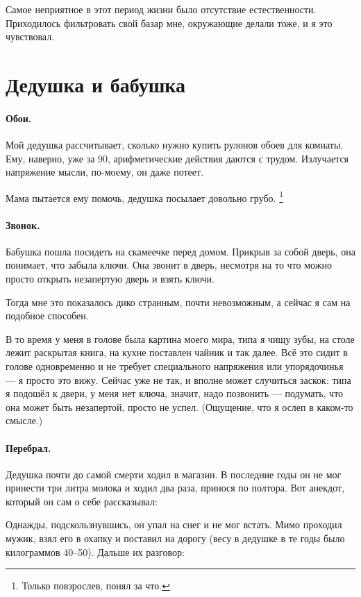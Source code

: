 \documentclass{book}
\begin{document}
Самое неприятное в этот период жизни было отсутствие естественности.
Приходилось фильтровать свой базар мне, окружающие делали тоже, и я это чувствовал.

\section*{Дедушка и бабушка}

\paragraph{Обои.} 
Мой дедушка рассчитывает, сколько нужно купить рулонов обоев для комнаты.
Ему, наверно, уже за 90, 
арифметические действия даются с трудом.
Излучается напряжение мысли, по-моему, он даже потеет.

Мама пытается ему помочь, 
дедушка посылает довольно грубо.%
\footnote{Только повзрослев, понял за что.}

\paragraph{Звонок.}
Бабушка пошла посидеть на скамеечке перед домом.
Прикрыв за собой дверь, она понимает, что забыла ключи.
Она звонит в дверь, несмотря на то что можно просто открыть незапертую дверь и взять ключи.

Тогда мне это показалось дико странным, почти невозможным, а сейчас я сам на подобное способен.

В то время у меня в голове была картина моего мира, типа я чищу зубы, на столе лежит раскрытая книга, на кухне поставлен чайник и так далее.
Всё это сидит в голове одновременно и не требует специального напряжения или упорядочинья --- я просто это вижу.
Сейчас уже не так, и вполне может случиться заскок: типа я подошёл к двери, у меня нет ключа, значит, надо позвонить --- подумать, что она может быть незапертой, просто не успел.
(Ощущение, что я ослеп в каком-то смысле.)

\paragraph{Перебрал.}
Дедушка почти до самой смерти ходил в магазин.
В последние годы он не мог принести три литра молока и ходил два раза, принося по полтора.
Вот анекдот, который он сам о себе рассказывал:

Однажды, подскользнувшись, он упал на снег и не мог встать.
Мимо проходил мужик, взял его в охапку и поставил на дорогу (весу в дедушке в те годы было килограммов 40--50).
Дальше их разговор:
\end{document}

